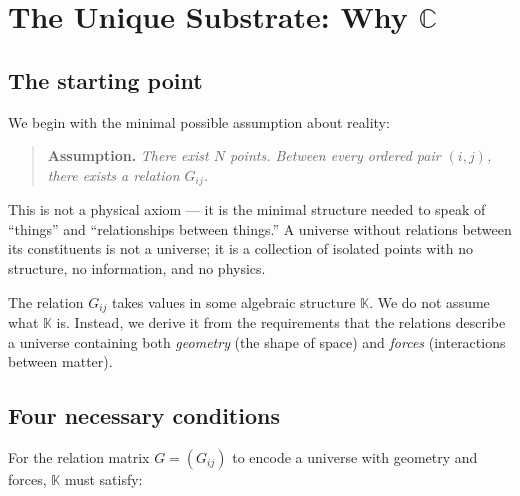 \section{The Unique Substrate: Why $\mathbb{C}$}
\label{ch:whyC}

\subsection{The starting point}

We begin with the minimal possible assumption about reality:

\begin{quote}
\textbf{Assumption.} \emph{There exist $N$ points. Between every ordered pair $(i, j)$, there exists a relation $G_{ij}$.}
\end{quote}

This is not a physical axiom --- it is the minimal structure needed to speak of ``things'' and ``relationships between things.'' A universe without relations between its constituents is not a universe; it is a collection of isolated points with no structure, no information, and no physics.

The relation $G_{ij}$ takes values in some algebraic structure $\mathbb{K}$. We do not assume what $\mathbb{K}$ is. Instead, we derive it from the requirements that the relations describe a universe containing both \emph{geometry} (the shape of space) and \emph{forces} (interactions between matter).

\subsection{Four necessary conditions}

For the relation matrix $G = (G_{ij})$ to encode a universe with geometry and forces, $\mathbb{K}$ must satisfy:

